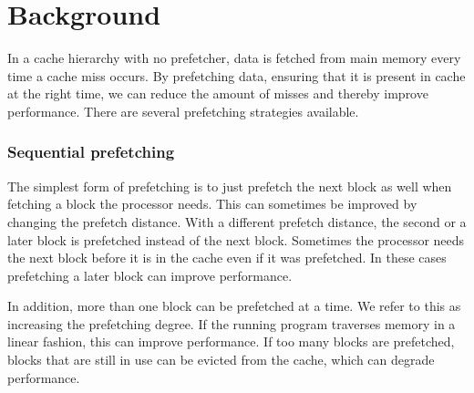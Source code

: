 \section{Background}
\label{sec:background}


In a cache hierarchy with no prefetcher, data is fetched from main memory every time a cache miss occurs.
By prefetching data, ensuring that it is present in cache at the right time, we can reduce the amount of misses and thereby improve performance.
There are several prefetching strategies available.

\subsubsection{Sequential prefetching}

The simplest form of prefetching is to just prefetch the next block
as well when fetching a block the processor needs. This can
sometimes be improved by changing the prefetch distance. With a
different prefetch distance, the second or a later block is
prefetched instead of the next block.
Sometimes the processor needs the next block before it is in
the cache even if it was prefetched. In these cases prefetching a
later block can improve performance.

In addition, more than one block can be prefetched at a time.
We refer to this as increasing the prefetching degree. If the
running program traverses memory in a linear fashion, this can
improve performance. If too many blocks are prefetched, blocks that
are still in use can be evicted from the cache, which can degrade performance.

